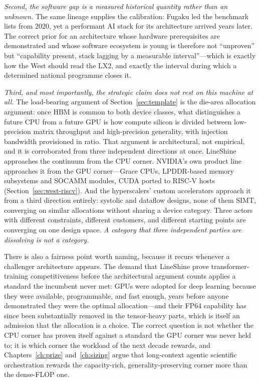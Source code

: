 \emph{Second, the software gap is a measured historical quantity rather than an unknown.} The same lineage supplies the calibration: Fugaku led the benchmark lists from 2020, yet a performant AI stack for its architecture arrived years later. The correct prior for an architecture whose hardware prerequisites are demonstrated and whose software ecosystem is young is therefore not ``unproven'' but ``capability present, stack lagging by a measurable interval''---which is exactly how the West should read the LX2, and exactly the interval during which a determined national programme closes it.

\emph{Third, and most importantly, the strategic claim does not rest on this machine at all.} The load-bearing argument of Section~\ref{sec:template} is the die-area allocation argument: once HBM is common to both device classes, what distinguishes a future CPU from a future GPU is how compute silicon is divided between low-precision matrix throughput and high-precision generality, with injection bandwidth provisioned in ratio. That argument is architectural, not empirical, and it is corroborated from three independent directions at once. LineShine approaches the continuum from the CPU corner. NVIDIA's own product line approaches it from the GPU corner---Grace CPUs, LPDDR-based memory subsystems and SOCAMM modules, CUDA ported to RISC-V hosts (Section~\ref{sec:west-riscv}). And the hyperscalers' custom accelerators approach it from a third direction entirely: systolic and dataflow designs, none of them SIMT, converging on similar allocations without sharing a device category. Three actors with different constraints, different customers, and different starting points are converging on one design space. \emph{A category that three independent parties are dissolving is not a category.}

There is also a fairness point worth naming, because it recurs whenever a challenger architecture appears. The demand that LineShine prove transformer-training competitiveness before the architectural argument counts applies a standard the incumbent never met: GPUs were adopted for deep learning because they were available, programmable, and fast enough, years before anyone demonstrated they were the optimal allocation---and their FP64 capability has since been substantially removed in the tensor-heavy parts, which is itself an admission that the allocation is a choice. The correct question is not whether the CPU corner has proven itself against a standard the GPU corner was never held to; it is which corner the workload of the next decade rewards, and Chapters~\ref{ch:prize} and~\ref{ch:sizing} argue that long-context agentic scientific orchestration rewards the capacity-rich, generality-preserving corner more than the dense-FLOP one.

